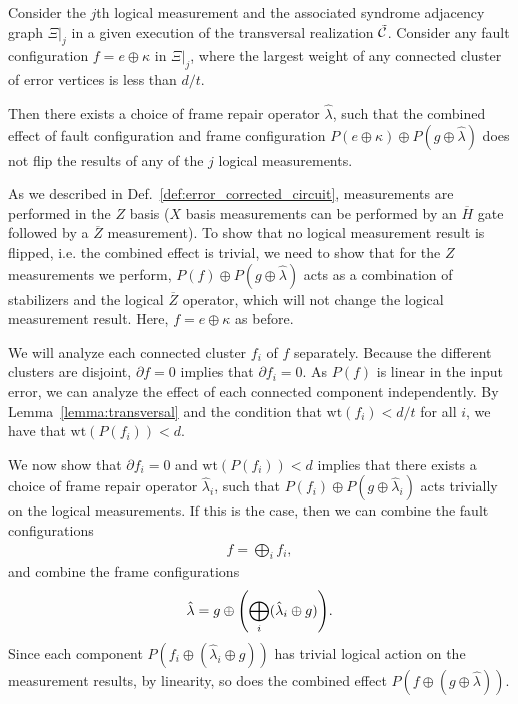 \begin{lemma}
\label{lemma:trivial_action}
Consider the $j$th logical measurement and the associated syndrome adjacency graph $\Xi|_j$ in a given execution of the transversal realization $\tilde{\mathcal{C}}$.
%
Consider any fault configuration $f=e\oplus \kappa$ in $\Xi|_j$, where the largest weight of any connected cluster of error vertices is less than $d/t$.

Then there exists a choice of frame repair operator $\hat{\lambda}$, such that the combined effect of fault configuration and frame configuration $P(e\oplus \kappa)\oplus P(g\oplus \hat{\lambda})$ does not flip the results of any of the $j$ logical measurements.
\end{lemma}

As we described in Def.~\ref{def:error_corrected_circuit}, measurements are performed in the $Z$ basis ($X$ basis measurements can be performed by an $\overline{H}$ gate followed by a $\overline{Z}$ measurement).
%
To show that no logical measurement result is flipped, i.e. the combined effect is trivial, we need to show that for the $Z$ measurements we perform, $P(f)\oplus P(g\oplus \hat{\lambda})$ acts as a combination of stabilizers and the logical $\overline{Z}$ operator, which will not change the logical measurement result.
%
Here, $f=e\oplus \kappa$ as before.

We will analyze each connected cluster $f_i$ of $f$ separately.
%
Because the different clusters are disjoint, $\partial f=0$ implies that $\partial f_i=0$.
%
As $P(f)$ is linear in the input error, we can analyze the effect of each connected component independently.
%
By Lemma~\ref{lemma:transversal} and the condition that $\textrm{wt}(f_i)<d/t$ for all $i$, we have that $\textrm{wt}(P(f_i))<d$.

We now show that $\partial f_i=0$ and $\textrm{wt}(P(f_i))<d$ implies that there exists a choice of frame repair operator $\hat{\lambda}_i$, such that $P(f_i)\oplus P(g\oplus \hat{\lambda}_i)$ acts trivially on the logical measurements.
%
If this is the case, then we can combine the fault configurations
\begin{align}
f=\bigoplus_i f_i,\label{eq:combine_fault}  
\end{align}
and combine the frame configurations 
\begin{align}
\hat{\lambda}=g\oplus\qty(\bigoplus_i (\hat{\lambda}_i\oplus g)).\label{eq:combine_frame}
\end{align}
%
Since each component $P(f_i \oplus (\hat{\lambda}_i\oplus g))$ has trivial logical action on the measurement results, by linearity, so does the combined effect $P(f\oplus (g\oplus\hat{\lambda}))$.

